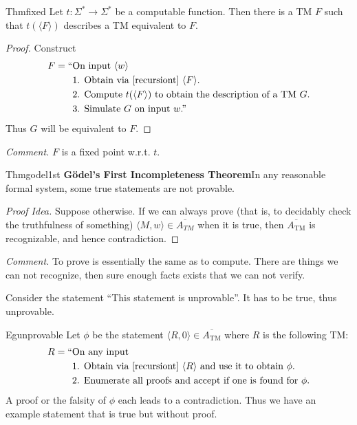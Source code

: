 \begin{reference}{Thm}{fixed}
  Let $t:\Sigma^*\to \Sigma^*$ be a computable function. Then there is a TM $F$ such that $t(\langle F\rangle)$ describes a TM equivalent to $F$.
\end{reference}

\begin{proof}
  Construct
  \begin{align*}
    F=\text{``} & \text{On input }\langle w\rangle                                                  \\
                & \text{1. Obtain via \ref{recursiont} }\langle F\rangle.                           \\
                & \text{2. Compute }t(\langle F\rangle)\text{ to obtain the description of a TM }G. \\
                & \text{3. Simulate }G\text{ on input }w\text{.''}
  \end{align*}
  Thus $G$ will be equivalent to $F$.
\end{proof}

\textit{Comment.} $F$ is a fixed point w.r.t. $t$.

\begin{reference}{Thm}{godel1st}
  \textbf{Gödel's First Incompleteness Theorem}\quad In any reasonable formal system, some true statements are not provable.
\end{reference}

\begin{proof}[Proof Idea]
  Suppose otherwise. If we can always prove (that is, to decidably check the truthfulness of something) $\langle M,w\rangle\in \overline{A_{TM}}$ when it is true, then $\overline{A_{\mathrm{TM}}}$ is recognizable, and hence contradiction.
\end{proof}

\textit{Comment.} To prove is essentially the same as to compute. There are things we can not recognize, then sure enough facts exists that we can not verify.

Consider the statement ``This statement is unprovable''. It has to be true, thus unprovable.

\begin{reference}{Eg}{unprovable}
  Let $\phi$ be the statement $\langle R,0\rangle\in \overline{A_{\mathrm{TM}}}$ where $R$ is the following TM:
  \begin{align*}
    R=\text{``} & \text{On any input}                                                                      \\
                & \text{1. Obtain via \ref{recursiont} }\langle R\rangle\text{ and use it to obtain }\phi. \\
                & \text{2. Enumerate all proofs and accept if one is found for }\phi.
  \end{align*}
  A proof or the falsity of $\phi$ each leads to a contradiction. Thus we have an example statement that is true but without proof.
\end{reference}

